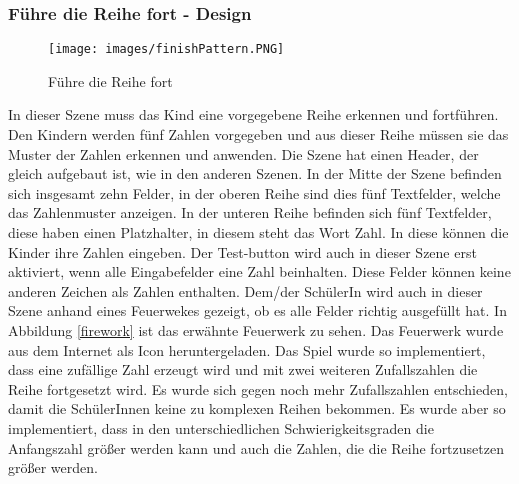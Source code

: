 \subsubsection{Führe die Reihe fort - Design}
\begin{figure}[htbp]
  \centering
  \texttt{[image: images/finishPattern.PNG]}
  \caption{Führe die Reihe fort}
  \label{finishPattern}
\end{figure}
In dieser Szene muss das Kind eine vorgegebene Reihe erkennen und fortführen. Den Kindern werden fünf Zahlen vorgegeben und aus dieser Reihe müssen sie das Muster der Zahlen erkennen und anwenden. Die Szene hat einen Header, der gleich aufgebaut ist, wie in den anderen Szenen. In der Mitte der Szene befinden sich insgesamt zehn Felder, in der oberen Reihe sind dies fünf Textfelder, welche das Zahlenmuster anzeigen. In der unteren Reihe befinden sich fünf Textfelder, diese haben einen Platzhalter, in diesem steht das Wort Zahl. In diese können die Kinder ihre Zahlen eingeben. Der Test-button wird auch in dieser Szene erst aktiviert, wenn alle Eingabefelder eine Zahl beinhalten. Diese Felder können keine anderen Zeichen als Zahlen enthalten. Dem/der SchülerIn wird auch in dieser Szene anhand eines Feuerwekes gezeigt, ob es alle Felder richtig ausgefüllt hat. In Abbildung \ref{firework} ist das erwähnte Feuerwerk zu sehen. Das Feuerwerk wurde aus dem Internet als Icon heruntergeladen\autocite{Feuerwerk}. Das Spiel wurde so implementiert, dass eine zufällige Zahl erzeugt wird und mit zwei weiteren Zufallszahlen die Reihe fortgesetzt wird. Es wurde sich gegen noch mehr Zufallszahlen entschieden, damit die SchülerInnen keine zu komplexen Reihen bekommen. Es wurde aber so implementiert, dass in den unterschiedlichen Schwierigkeitsgraden die Anfangszahl größer werden kann und auch die Zahlen, die die Reihe fortzusetzen größer werden.
